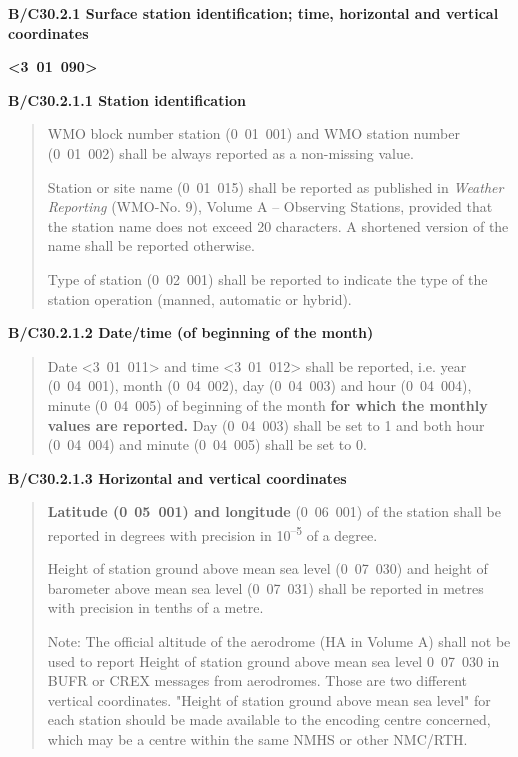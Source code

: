 \textbf{B/C30.2.1 Surface station identification; time, horizontal and vertical coordinates}

\textbf{\textless3~01~090\textgreater{}}

\textbf{B/C30.2.1.1 Station identification}

\begin{quote}
WMO block number station (0~01~001) and WMO station number (0~01~002) shall be always reported as a non-missing value.

Station or site name (0~01~015) shall be reported as published in \emph{Weather Reporting} (WMO-No. 9), Volume A -- Observing Stations, provided that the station name does not exceed 20 characters. A shortened version of the name shall be reported otherwise.

Type of station (0~02~001) shall be reported to indicate the type of the station operation (manned, automatic or hybrid).
\end{quote}

\textbf{B/C30.2.1.2 Date/time (of beginning of the month)}

\begin{quote}
Date \textless3~01~011\textgreater{} and time \textless3~01~012\textgreater{} shall be reported, i.e. year (0~04~001), month (0~04~002), day (0~04~003) and hour (0~04~004), minute (0~04~005) of beginning of the month \textbf{for which the monthly values are reported.} Day (0~04~003) shall be set to 1 and both hour (0~04~004) and minute (0~04~005) shall be set to 0.
\end{quote}

\textbf{B/C30.2.1.3 Horizontal and vertical coordinates}

\begin{quote}
\textbf{Latitude (0}~\textbf{05~001) and longitude} (0~06~001) of the station shall be reported in degrees with precision in 10\textsuperscript{--5} of a degree.

Height of station ground above mean sea level (0~07~030) and height of barometer above mean sea level (0~07~031) shall be reported in metres with precision in tenths of a metre.

Note: The official altitude of the aerodrome (HA in Volume A) shall not be used to report Height of station ground above mean sea level 0~07~030 in BUFR or CREX messages from aerodromes. Those are two different vertical coordinates. "Height of station ground above mean sea level" for each station should be made available to the encoding centre concerned, which may be a centre within the same NMHS or other NMC/RTH.
\end{quote}

